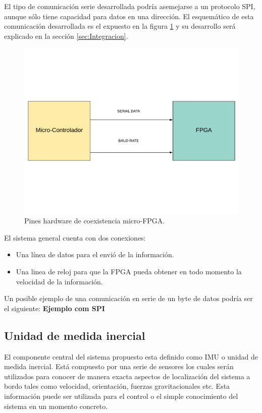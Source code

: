 El tipo de comunicación serie desarrollada podría asemejarse a un protocolo SPI, aunque sólo tiene capacidad para datos en una dirección. El esquemático de esta comunicación desarrollada es el expuesto en la figura \ref{fig:coexistencia2} y su desarrollo será explicado en la sección \ref{sec:Integracion}.

\begin{figure}[H]
	\center
	\includegraphics[trim = 0mm 40mm 0mm 20mm, clip,scale=0.4]{imagenes/Balancing_robot/coexistencia2.pdf}
	\caption{Pines hardware de coexistencia micro-FPGA.}
	\label{fig:coexistencia2}
\end{figure}
El sistema general cuenta con dos conexiones:
\begin{itemize}
	\item Una línea de datos para el envió de la información.
	\item Una linea de reloj para que la FPGA pueda obtener en todo momento la velocidad de la información.
\end{itemize}

Un posible ejemplo de una comunicación en serie de un byte de datos podría ser el siguiente: 
\textbf{Ejemplo com SPI}




\subsection{Unidad de medida inercial}
El componente central del sistema propuesto esta definido como IMU o unidad de medida inercial. Está compuesto por una serie de sensores los cuales serán utilizados para conocer de manera exacta aspectos de localización del sistema a bordo tales como velocidad, orientación, fuerzas gravitacionales etc. \newline
Esta información puede ser utilizada para el control o el simple conocimiento del sistema en un momento concreto. \newlinw

